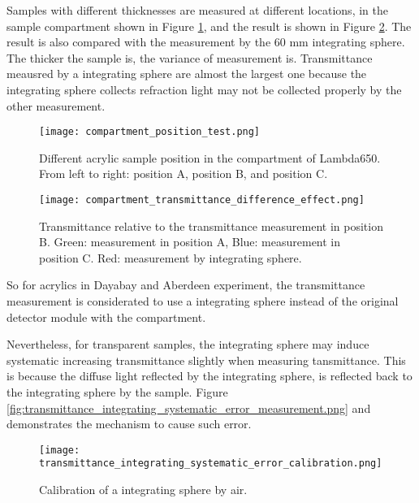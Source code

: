 

Samples with different thicknesses are measured at different locations, in the sample compartment shown in Figure \ref{compartment_position_test.png},
and the result is shown in Figure \ref{compartment_transmittance_difference_effect.png}.
The result is also compared with the measurement by the 60 mm integrating sphere.
The thicker the sample is, the variance of
measurement is. Transmittance meausred by a integrating sphere
are almost the largest one because the integrating sphere collects refraction light may
not be collected properly by the other measurement.

\begin{figure}
    \centering
    \texttt{[image: compartment\_position\_test.png]}
    \caption{Different acrylic sample position in the compartment of Lambda650. From
 left to right: position A, position B, and position C.}
    \label{compartment_position_test.png}
    \end{figure}


\begin{figure}
    \centering
    \texttt{[image: compartment\_transmittance\_difference\_effect.png]}
    \caption{Transmittance relative to the transmittance measurement in position B. Green: measurement in position A, Blue:
 measurement in position C. Red: measurement by integrating sphere.}
    \label{compartment_transmittance_difference_effect.png}
    \end{figure}


So for acrylics in Dayabay and Aberdeen experiment, the transmittance measurement is
considerated to use a integrating sphere instead of the original detector module with the compartment.

Nevertheless, for transparent samples, the integrating sphere
may induce systematic increasing transmittance slightly when measuring tansmittance.
This is because the diffuse light reflected by the integrating
sphere, is reflected back to the integrating sphere by the sample.
Figure \ref{fig:transmittance_integrating_systematic_error_measurement.png} and
demonstrates the mechanism to cause such error.


\begin{figure}
    \centering
    \texttt{[image: transmittance\_integrating\_systematic\_error\_calibration.png]}
    \caption{Calibration of a integrating sphere by air.}
    \label{fig:transmittance_integrating_systematic_error_calibration.png}
    \end{figure}


